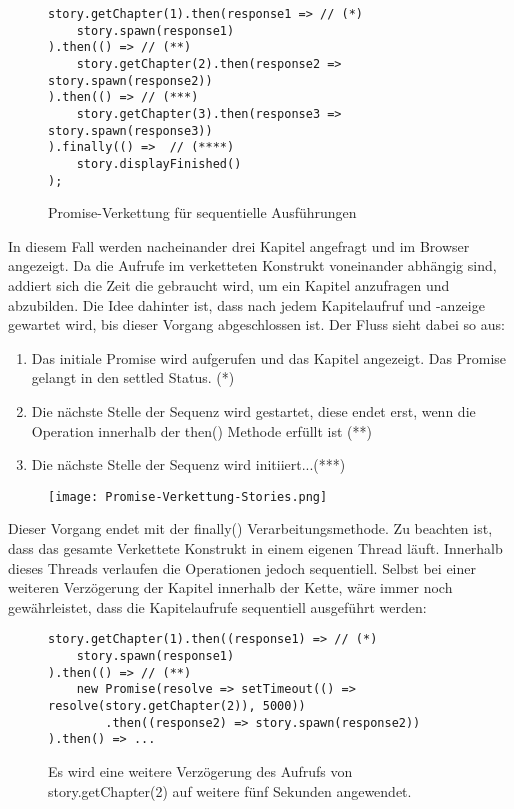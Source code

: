\begin{figure}[H]
\begin{lstlisting}[basicstyle=\small]
story.getChapter(1).then(response1 => // (*)
    story.spawn(response1)
).then(() => // (**)
    story.getChapter(2).then(response2 => story.spawn(response2))
).then(() => // (***)
    story.getChapter(3).then(response3 => story.spawn(response3))
).finally(() =>  // (****)
    story.displayFinished()
);
\end{lstlisting}
\caption{Promise-Verkettung für sequentielle Ausführungen}
\label{Promises-sequential-calls}
\end{figure}

\noindent
In diesem Fall werden nacheinander drei Kapitel angefragt und im Browser angezeigt. Da die Aufrufe im verketteten Konstrukt voneinander abhängig sind, addiert sich die Zeit die gebraucht wird, um ein Kapitel anzufragen und abzubilden. Die Idee dahinter ist, dass nach jedem Kapitelaufruf und -anzeige gewartet wird, bis dieser Vorgang abgeschlossen ist. Der Fluss sieht dabei so aus:

\begin{enumerate}
    \item Das initiale Promise wird aufgerufen und das Kapitel angezeigt. Das Promise gelangt in den settled Status. (*)
    \item Die nächste Stelle der Sequenz wird gestartet, diese endet erst, wenn die Operation innerhalb der then() Methode erfüllt ist (**)
    \item Die nächste Stelle der Sequenz wird initiiert...(***)
\end{enumerate}

\begin{figure}[H]
\centering
\texttt{[image: Promise-Verkettung-Stories.png]}
\end{figure}

\noindent
Dieser Vorgang endet mit der finally() Verarbeitungsmethode. Zu beachten ist, dass das gesamte Verkettete Konstrukt in einem eigenen Thread läuft. Innerhalb dieses Threads verlaufen die Operationen jedoch sequentiell. Selbst bei einer weiteren Verzögerung der Kapitel innerhalb der Kette, wäre immer noch gewährleistet, dass die Kapitelaufrufe sequentiell ausgeführt werden:

\begin{figure}[H]
\begin{lstlisting}[basicstyle=\small]
story.getChapter(1).then((response1) => // (*)
    story.spawn(response1)
).then(() => // (**)
    new Promise(resolve => setTimeout(() => resolve(story.getChapter(2)), 5000))
        .then((response2) => story.spawn(response2))
).then() => ...
\end{lstlisting}
\caption{Es wird eine weitere Verzögerung des Aufrufs von story.getChapter(2) auf weitere fünf Sekunden angewendet.}
\end{figure}

